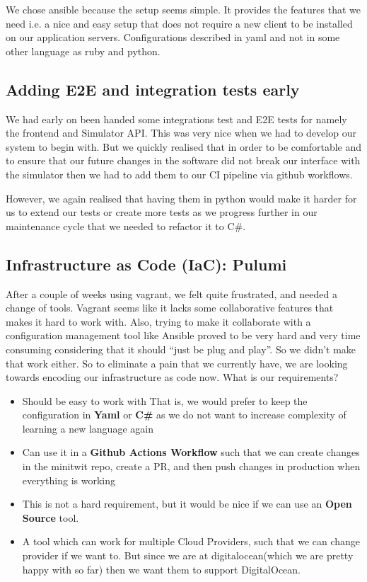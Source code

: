 We chose ansible because the setup seems simple. It provides the features that we need i.e. a nice and easy setup that does not require a new client to be installed on our application servers. Configurations described in yaml and not in some other language as ruby and python. 


\subsection{Adding E2E and integration tests early}

We had early on been handed some integrations test and E2E tests for namely the frontend and Simulator API. This was very nice when we had to develop our system to begin with. But we quickly realised that in order to be comfortable and to ensure that our future changes in the software did not break our interface with the simulator then we had to add them to our CI pipeline via github workflows.

However, we again realised that having them in python would make it harder for us to extend our tests or create more tests as we progress further in our maintenance cycle that we needed to refactor it to C\#.

\subsection{Infrastructure as Code (IaC): Pulumi}

After a couple of weeks using vagrant, we felt quite frustrated, and needed a change of tools. Vagrant seems like it lacks some collaborative features that makes it hard to work with. Also, trying to make it collaborate with a configuration management tool like Ansible proved to be very hard and very time consuming considering that it should “just be plug and play”. So we didn’t make that work either. So to eliminate a pain that we currently have, we are looking towards encoding our infrastructure as code now. What is our requirements?

\begin{itemize}
    \item Should be easy to work with
        \subitem That is, we would prefer to keep the configuration in \textbf{Yaml} or \textbf{C\#} as we do not want to increase complexity of learning a new language again
    \item Can use it in a \textbf{Github Actions Workflow} such that we can create changes in the minitwit repo, create a PR, and then push changes in production when everything is working
    \item This is not a hard requirement, but it would be nice if we can use an \textbf{Open Source} tool.
    \item A tool which can work for multiple Cloud Providers, such that we can change provider if we want to. But since we are at digitalocean(which we are pretty happy with so far) then we want them to support DigitalOcean.
\end{itemize}

